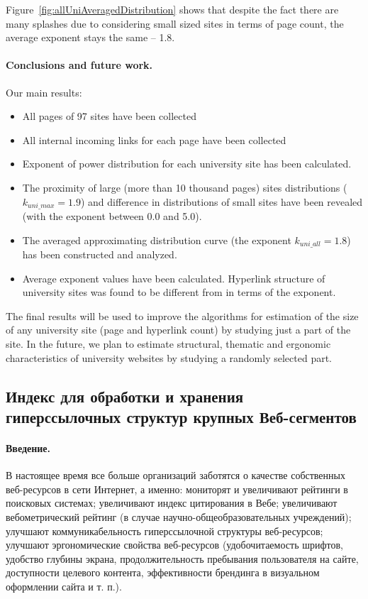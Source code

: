 Figure~\cref{fig:allUniAveragedDistribution} shows that despite the fact there are many splashes due to considering small sized sites in terms of page count, the average exponent stays the same -- 1.8.

\paragraph{Conclusions and future work.} Our main results: 

\begin{itemize}
	\item All pages of 97 sites have been collected
	\item All internal incoming links for each page have been
	collected
	\item Exponent of power distribution for each university site
	has been calculated.
	\item The proximity of large (more than 10 thousand pages)
	sites distributions (\(k_\textit{uni\_max} = 1.9\)) and difference in
	distributions of small sites have been revealed (with
	the exponent between 0.0 and 5.0).
	\item The averaged approximating distribution curve (the
	exponent \(k_\textit{uni\_all} = 1.8\)) has been constructed and
	analyzed.
	\item Average exponent values have been calculated.
	Hyperlink structure of university sites was found to be
	different from \cite{BarabasiAlbert,BroderKumarMaghoul} in terms of the exponent.
\end{itemize}

The final results will be used to improve the algorithms for estimation of the size of any university site (page and hyperlink count) by studying just a part of the site. In the future, we plan to estimate structural, thematic and ergonomic characteristics of university websites by studying a randomly selected part. 

\subsection{Индекс для обработки и хранения гиперссылочных структур крупных Веб-сегментов}\label{subsec:ch1/sec2/sub3}

\paragraph{Введение.} В настоящее время все больше организаций заботятся о качестве собственных веб-ресурсов в сети Интернет, а именно: мониторят и увеличивают рейтинги в поисковых системах; увеличивают индекс цитирования в Вебе; увеличивают вебометрический рейтинг \cite{RankingWeb} (в случае научно-общеобразовательных учреждений); улучшают коммуникабельность гиперссылочной структуры веб-ресурсов; улучшают эргономические свойства веб-ресурсов (удобочитаемость шрифтов, удобство глубины экрана, продолжительность пребывания пользователя на сайте, доступности целевого контента, эффективности брендинга в визуальном оформлении сайта и т. п.).

